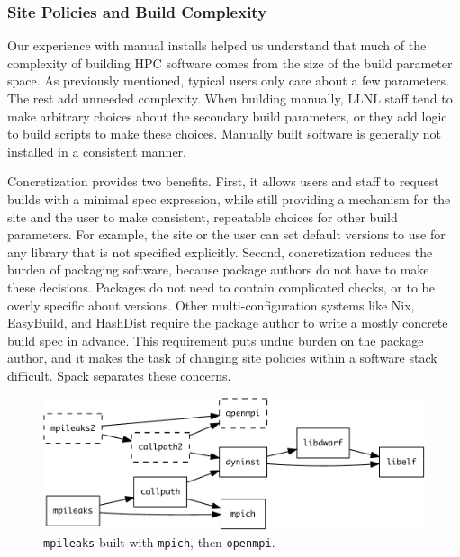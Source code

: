 \subsubsection{Site Policies and Build Complexity}

Our experience with manual installs helped us understand that much of the complexity
of building HPC software comes from the size of the build parameter space.
As previously mentioned, typical users only care about a few parameters.
The rest add unneeded complexity.  When building manually, LLNL staff
tend to make arbitrary choices about the secondary build parameters,
or they add logic to build scripts to make these choices.
Manually built software is generally not installed in a consistent manner.

Concretization provides two benefits.  First, it allows users and staff to
request builds with a minimal spec expression, while still providing a
mechanism for the site and the user to make consistent, repeatable choices 
for other build parameters.  For example, the site or the user can set 
default versions to use for any library that is not specified explicitly.
%
Second, concretization reduces the burden of packaging software, because
package authors do not have to make these decisions. Packages do not need 
to contain complicated checks, or to be overly specific about versions.  
Other multi-configuration systems like Nix, EasyBuild, and HashDist require 
the package author to write a mostly concrete build spec in advance.
This requirement puts undue burden on the package author, and it makes the task
of changing site policies within a software stack difficult.  Spack
separates these concerns.

\begin{figure}\centering
   \includegraphics[width=.9\linewidth]{specs/rpaths.pdf}
   \caption{
       {\tt mpileaks} built with {\tt mpich}, then {\tt openmpi}.
       \label{fig:reuse}
   }
\end{figure}
